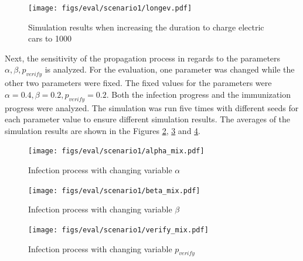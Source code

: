 \begin{figure}[!ht]
    \center
    \texttt{[image: figs/eval/scenario1/longev.pdf]}
    \caption{Simulation results when increasing the duration to 
    charge electric cars to 1000}
    \label{firstscenariobasicevchange}
\end{figure}

Next, the sensitivity of the propagation process 
in regards to the parameters $\alpha, \beta, p_{verify}$ 
is analyzed. For the evaluation, one parameter was changed
while the other two parameters were fixed.
The fixed values for the parameters were 
$\alpha=0.4, \beta=0.2, p_{verify}=0.2$. 
Both the infection progress and 
the immunization progress were analyzed.
The simulation was run five times with different seeds 
for each parameter value to ensure different 
simulation results. The averages of the simulation 
results are shown in the Figures \ref{scen1variablealpha},
\ref{scen1variablebeta} and \ref{scen1variablepverify}.


\begin{figure}[!ht]
    \centering
    \texttt{[image: figs/eval/scenario1/alpha\_mix.pdf]}
    \caption{Infection process with changing variable $\alpha$}
    \label{scen1variablealpha} 
\end{figure}

\begin{figure}[!ht]
    \centering
    \texttt{[image: figs/eval/scenario1/beta\_mix.pdf]}
    \caption{Infection process with changing variable $\beta$}
    \label{scen1variablebeta} 
\end{figure}

\begin{figure}[!ht]
    \centering
    \texttt{[image: figs/eval/scenario1/verify\_mix.pdf]}
    \caption{Infection process with changing variable $p_{verify}$}
    \label{scen1variablepverify} 
\end{figure}

